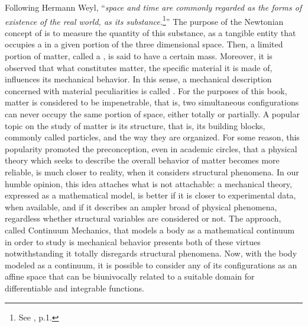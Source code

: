 Following Hermann Weyl, ``\emph{space and time are commonly regarded as the forms of existence of the real world,  as its substance.}\footnote{See \cite{weyl_1952_2}, p.1.}'' The purpose of the Newtonian concept of  is to measure the quantity of this substance, as a tangible entity that occupies a  in a given portion of the three dimensional space. Then, a limited portion of matter, called a , is said to have a certain mass. Moreover, it is observed that what constitutes matter, the specific material it is made of, influences its mechanical behavior. In this sense, a mechanical description concerned with material peculiarities is called . For the purposes of this book, matter is considered to be impenetrable, that is, two simultaneous configurations can never occupy the same portion of space, either totally or partially. A popular topic on the study of matter is its structure, that is, its building blocks, commonly called particles, and the way they are organized. For some reason, this popularity promoted the preconception, even in academic circles, that a physical theory which seeks to describe the overall behavior of matter becomes more reliable, is much closer to reality, when it considers structural phenomena. In our humble opinion, this idea attaches what is not attachable: a mechanical theory, expressed as a mathematical model, is better if it is closer to experimental data, when available, and if it describes an ampler broad of physical phenomena, regardless whether structural variables are considered or not. The approach, called Continuum Mechanics, that models a body as a mathematical continuum in order to study is mechanical behavior presents both of these virtues notwithstanding it totally disregards structural phenomena. Now, with the body modeled as a continuum, it is possible to consider any of its configurations as an affine space that can be biunivocally related to a suitable domain for differentiable and integrable functions.







